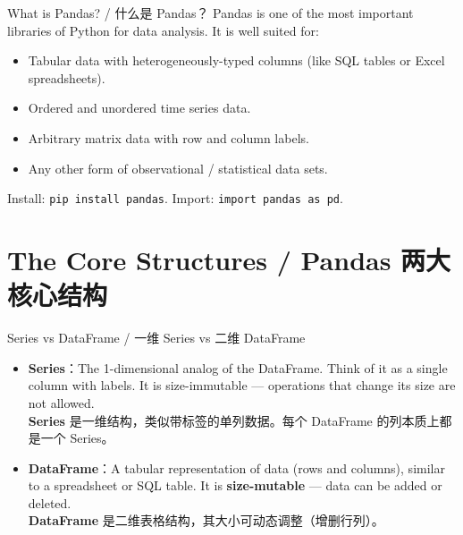 \documentclass[11pt,a4paper]{report}
\let\oldtexttt\texttt
\renewcommand{\texttt}[1]{\textcolor{mainblue}{\oldtexttt{#1}}}
\begin{document}
\begin{concept}{What is Pandas? / 什么是 Pandas？}
    Pandas is one of the most important libraries of Python for data analysis. It is well suited for:
    \begin{itemize}[itemsep=0.3em]
        \item Tabular data with heterogeneously-typed columns (like SQL tables or Excel spreadsheets).
        \item Ordered and unordered time series data.
        \item Arbitrary matrix data with row and column labels.
        \item Any other form of observational / statistical data sets.
    \end{itemize}
    Install: \texttt{pip install pandas}. Import: \texttt{import pandas as pd}.
\end{concept}

\section{The Core Structures / Pandas 两大核心结构}

\begin{concept}{Series vs DataFrame / 一维 Series vs 二维 DataFrame}
    \begin{itemize}[itemsep=0.5em]
        \item \textbf{Series}：The 1-dimensional analog of the DataFrame. Think of it as a single column with labels. It is size-immutable — operations that change its size are not allowed. \\
        \textbf{Series} 是一维结构，类似带标签的单列数据。每个 DataFrame 的列本质上都是一个 Series。
        \item \textbf{DataFrame}：A tabular representation of data (rows and columns), similar to a spreadsheet or SQL table. It is \textbf{size-mutable} — data can be added or deleted. \\
        \textbf{DataFrame} 是二维表格结构，其大小可动态调整（增删行列）。
    \end{itemize}
\end{concept}
\end{document}
